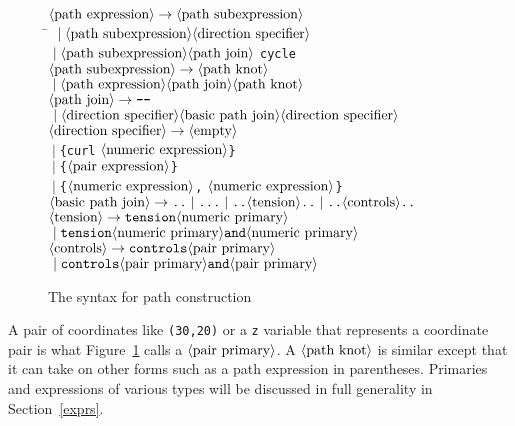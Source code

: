 \documentclass{article} %
\newcommand\descr[1]{{\langle\hbox{#1}\rangle}}
\begin{document}
\begin{figure}[htp]
\begin{ctabbing}
$\descr{path expression} \rightarrow
        \descr{path subexpression}$\\
\qquad \= ${}\mid \descr{path subexpression} \descr{direction specifier}$\\
\>       ${}\mid \descr{path subexpression} \descr{path join}$ \verb|cycle|\\
$\descr{path subexpression} \rightarrow
        \descr{path knot}$\\
\>      ${}\mid \descr{path expression} \descr{path join} \descr{path knot}$\\
$\descr{path join} \rightarrow
        \hbox{\verb|--|}$\\
\>      ${}\mid \descr{direction specifier} \descr{basic path join}
                \descr{direction specifier}$\\
$\descr{direction specifier} \rightarrow
        \descr{empty}$\\
\>      ${}\mid {}$\verb|{curl| $\descr{numeric expression}$\verb|}|\\
\>      ${}\mid {}$\verb|{|$\descr{pair expression}$\verb|}|\\
\>      ${}\mid {}$\verb|{|$\descr{numeric expression}$\verb|,|%
                $\descr{numeric expression}$\verb|}|\\
$\descr{basic path join} \rightarrow
        \hbox{\verb|..|}
        \mid \hbox{\verb|...|}
        \mid \hbox{\verb|..|}\descr{tension}\hbox{\verb|..|}
        \mid \hbox{\verb|..|}\descr{controls}\hbox{\verb|..|}$\\
$\descr{tension} \rightarrow
        \hbox{\verb|tension|}\descr{numeric primary}$\\
\>      ${}\mid \hbox{\verb|tension|}\descr{numeric primary}
                \hbox{\verb|and|}\descr{numeric primary}$\\
$\descr{controls} \rightarrow
        \hbox{\verb|controls|}\descr{pair primary}$\\
\>      ${}\mid \hbox{\verb|controls|}\descr{pair primary}
                \hbox{\verb|and|}\descr{pair primary}$
\end{ctabbing}
\caption{The syntax for path construction}
\label{sypath}
\end{figure}

A pair of coordinates like \verb|(30,20)| or a \verb|z| variable that
represents a coordinate pair is what Figure~\ref{sypath} calls a
$\descr{pair primary}$.  A $\descr{path knot}$ is similar except that it
can take on other forms such as a path expression in parentheses.
Primaries and expressions of various types will be discussed in full
generality in Section~\ref{exprs}.
\end{document}
